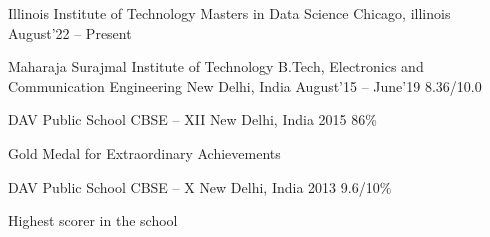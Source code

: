 

\begin{cventries}
  \smallcventry
  {Illinois Institute of Technology}
  {Masters in Data Science}
  {Chicago, illinois}
  {August'22 -- Present}
  {}
  {}
\end{cventries}

\begin{cventries}
  \smallcventry
  {Maharaja Surajmal Institute of Technology}
  {B.Tech, Electronics and Communication Engineering}
  {New Delhi, India}
  {August'15 -- June'19}
  {8.36/10.0}
  {}
\end{cventries}
\begin{cventries}
  \smallcventry
  {DAV Public School}
  {CBSE -- XII}
  {New Delhi, India}
  {2015}
  {86\%}
  {
    \begin{cvitems}
    \item Gold Medal for Extraordinary Achievements
    \end{cvitems}
  }
\end{cventries}
\begin{cventries}
  \smallcventry
  {DAV Public School}
  {CBSE -- X}
  {New Delhi, India}
  {2013}
  {9.6/10\%}
  {
    \begin{cvitems}
    \item Highest scorer in the school
    \end{cvitems}
  }
\end{cventries}
\vspace{-2mm}
